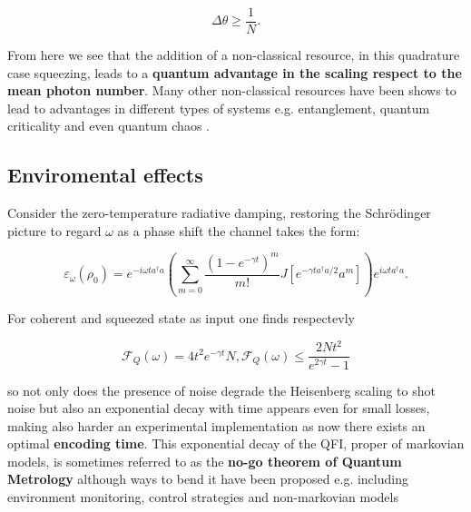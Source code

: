 \begin{equation}
\Delta \theta \geq \frac{1}{N}.
\end{equation}

From here we see that the addition of a non-classical resource, in this quadrature case squeezing, leads to a \textbf{quantum advantage in
  the scaling respect to the mean photon number}. Many other non-classical resources have been shows to lead to advantages in different types
of systems e.g. entanglement, quantum criticality and even quantum chaos \cite{escher_general_2011, giovannetti_quantum_2006, jiao_quantum_2023}.
\subsection{Enviromental effects}
Consider the zero-temperature radiative damping,  restoring the Schr{\"o}dinger picture to regard $\omega $ as a phase shift the channel takes
the form:

\begin{equation}
  \varepsilon_{\omega}(\rho_{0}) = e^{-i\omega t a^{\dagger}a}\left(\sum_{m=0}^{\infty}\frac{(1-e^{-\gamma t})^{m}}{m!}J[e^{-\gamma t a^{\dagger}a/2}a^{m}]\right)e^{i\omega t a^{\dagger}a}.
\end{equation}

For coherent and squeezed state as input one finds respectevly \cite{jiao_quantum_2023}

\begin{equation}
\mathcal{F}_{Q}(\omega) = 4t^{2}e^{-\gamma t}N, \mathcal{F}_{Q}(\omega) \leq \frac{2Nt^{2}}{e^{2\gamma t}-1}
\end{equation}

so not only does the presence of noise degrade the Heisenberg scaling to shot noise but also an exponential decay with time appears even
for small losses, making also harder an experimental implementation as now there exists an optimal \textbf{encoding time}. This exponential
decay of the QFI, proper of markovian models, is sometimes referred to as the \textbf{no-go theorem of Quantum Metrology} although
ways to bend it have been proposed e.g. including environment monitoring, control strategies and non-markovian models

